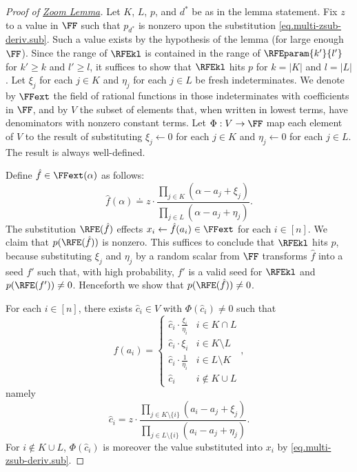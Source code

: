 \documentclass{toc}
\begin{document}
\begin{proof}[Proof of \texorpdfstring{\hyperref[lem.multi-zsub-deriv]{Zoom Lemma}}{Zoom Lemma}]
  Let \(K\), \(L\), \(p\), and \(d^*\) be as in the lemma statement. Fix $z$ to a value in $\FF$ such that $p_{d^*}$ is nonzero upon the substitution \eqref{eq.multi-zsub-deriv.sub}. Such a value exists by the hypothesis of the lemma (for large enough $\FF$). Since the range of $\RFEkl$ is contained in the range of $\RFEparam{k'}{l'}$ for $k'\ge k$ and $l'\ge l$, 
  it suffices to show that $\RFEkl$ hits $p$ for \(k = |K|\) and \(l = |L|\).
  Let \(\xi_j\) for each \(j \in K\)
  and \(\eta_j\) for each \(j \in L\)
  be fresh indeterminates.
  We denote by \(\FFext\) the field of rational functions in those
  indeterminates with coefficients in $\FF$, and by
  $V$ the subset of elements that, when written in lowest terms,
  have denominators with nonzero constant terms.
  Let \(\Phi : V \to \FF\) map each element of \(V\) to the result of
  substituting \(\xi_j \gets 0\) for each \(j \in K\) and \(\eta_j \gets 0\)
  for each \(j \in L\).
  The result is always well-defined.

  Define \(\hat{f} \in \FFext(\alpha)\) as follows:
  \begin{equation*}
    \hat{f}(\alpha)
    \doteq
    z\cdot \frac{\prod_{j \in K}(\alpha - a_j + \xi_j)}%
                {\prod_{j \in L}(\alpha - a_j + \eta_j)}.
  \end{equation*}
  The substitution \(\RFE(\hat{f})\) effects
  \(x_i \gets \hat{f}(a_i) \in \FFext\) for each $i \in [n]$.
  We claim that \(p(\RFE(\hat{f}))\) is nonzero.
  This suffices to conclude that \(\RFEkl\) hits \(p\),
  because substituting \(\xi_j\) and \(\eta_j\) by a random scalar from
  \(\FF\) transforms \(\hat{f}\) into a seed $f'$
  such that,
  with high probability,
  $f'$ is a valid seed for \(\RFEkl\)
  and \(p(\RFE(f')) \ne 0\).
  Henceforth we show that \(p(\RFE(\hat{f})) \ne 0\).

  For each \(i \in [n]\),
  there exists \(\hat{c}_i \in V\)
  with \(\Phi(\hat{c}_i) \ne 0\)
  such that
  \begin{equation} \label{eq.multi-zsub-deriv.pf.seed}
    \hat{f}(a_i) = \begin{cases}
      \hat{c}_i\cdot \frac{\xi_i}{\eta_i} & i \in K\cap L \\
      \hat{c}_i\cdot \xi_i & i \in K\setminus L \\
      \hat{c}_i\cdot \frac{1}{\eta_i} & i \in L \setminus K \\
      \hat{c}_i & i \not\in K \cup L
    \end{cases},
  \end{equation}
  namely
  \[
    \hat{c}_i =  z\cdot
      \frac{\prod_{j \in K\setminus\{i\}}(a_i - a_j + \xi_j)}%
           {\prod_{j \in L\setminus\{i\}}(a_i - a_j + \eta_j)}.
  \]
  For \(i \not\in K \cup L\),
  \(\Phi(\hat{c}_i)\) is moreover the value substituted into \(x_i\) by
  \eqref{eq.multi-zsub-deriv.sub}.


\end{proof}
\end{document}
